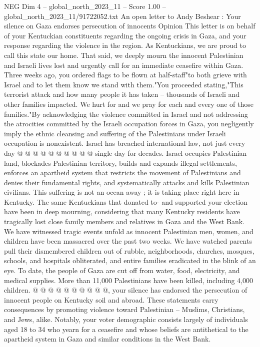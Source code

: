 \begin{textsample}{NEG Dim 4 – global\_north\_2023\_11 – Score 1.00 – global\_north\_2023\_11/91722052.txt}  \label{ex:f4_neg_188}
An open letter to Andy Beshear : Your silence on Gaza endorses persecution of innocents Opinion This letter is on behalf of your Kentuckian constituents regarding the ongoing crisis in Gaza, and your response regarding the violence in the region.
As Kentuckians, we are proud to call this state our home.
That said, we deeply mourn the innocent Palestinian and Israeli lives lost and urgently call for an immediate ceasefire within Gaza.
Three weeks ago, you ordered flags to be flown at half-staff"to both grieve with Israel and to let them know we stand with them."You proceeded stating,"This terrorist attack and how many people it has taken -- thousands of Israeli and other families impacted.
We hurt for and we pray for each and every one of those families."By acknowledging the violence committed in Israel and not addressing the atrocities committed by the Israeli occupation forces in Gaza, you negligently imply the ethnic cleansing and suffering of the Palestinians under Israeli occupation is nonexistent.
Israel has breached international law, not just every day @ @ @ @ @ @ @ @ @ @ single day for decades.
Israel occupies Palestinian land, blockades Palestinian territory, builds and expands illegal settlements, enforces an apartheid system that restricts the movement of Palestinians and denies their fundamental rights, and systematically attacks and kills Palestinian civilians.
This suffering is not an ocean away ; it is taking place right here in Kentucky.
The same Kentuckians that donated to- and supported your election have been in deep mourning, considering that many Kentucky residents have tragically lost close family members and relatives in Gaza and the West Bank.
We have witnessed tragic events unfold as innocent Palestinian men, women, and children have been massacred over the past two weeks.
We have watched parents pull their dismembered children out of rubble, neighborhoods, churches, mosques, schools, and hospitals obliterated, and entire families eradicated in the blink of an eye.
To date, the people of Gaza are cut off from water, food, electricity, and medical supplies.
More than 11,000 Palestinians have been killed, including 4,000 children. @ @ @ @ @ @ @ @ @ @, your silence has endorsed the persecution of innocent people on Kentucky soil and abroad.
These statements carry consequences by promoting violence toward Palestinian -- Muslims, Christians, and Jews, alike.
Notably, your voter demographic consists largely of individuals aged 18 to 34 who yearn for a ceasefire and whose beliefs are antithetical to the apartheid system in Gaza and similar conditions in the West Bank.

\end{textsample}
